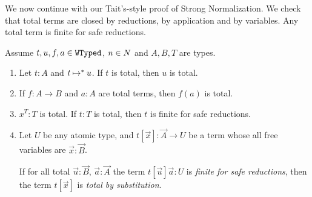 %
%
%

We now continue with our Tait's-style proof of Strong Normalization.
We check that total terms are closed by reductions, by application and by variables.
Any total term is finite for safe reductions.



\begin{lemma}\label{lem:total_value-finiteness}
Assume $t,u,f,a \in {\tt WTyped}$, $n \in {N}$ and $A,B,T$ are types.

  \begin{enumerate}
  \item
\label{lem:total_value-finiteness1}
    Let $t:A$ and $t \mathbin{\mapsto}^{*} u$.
    If $t$ is total, then $u$ is total.

  \item
\label{lem:total_value-finiteness2}
    If $f:A \rightarrow B$ and $a:A$ are total terms, then $f(a)$ is total.

  \item
\label{lem:total_value-finiteness2bis}
    $x^T:T$ is total. If $t:T$ is total, then $t$ is  finite for safe reductions.

  \item
\label{lem:total_value-finiteness3}
    Let $U$ be any atomic type, and $t[\vec{x}]:\vec{A}\rightarrow U$ be a term
    whose all free variables are $\vec{x}:\vec{B}$.

    If for all total $\vec{u}:\vec{B}$, $\vec{a}:\vec{A}$ the term 
    $t[\vec{u}]\vec{a}: U$ is \emph{finite for safe reductions}, then
    the term $t[\vec{x}]$ is \emph{total by substitution}.
  \end{enumerate}

\end{lemma}


